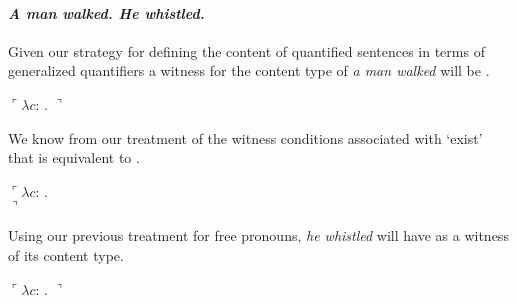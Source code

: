 \paragraph{\textit{A man walked. He whistled.} }
\label{sec:discourse-anaph}
Given our strategy for defining the content of quantified sentences in
terms of generalized quantifiers a witness for the content type of \textit{a man walked}
will be \nexteg{}.
\begin{ex} 
  $\ulcorner\lambda c$: . $\urcorner$ 
\end{ex}
We know from our treatment of the witness conditions associated with
`exist' that \preveg{} is equivalent to \nexteg{}.
\begin{ex} 
  $\ulcorner\lambda c$: . \\
  \hspace*{4em}$\urcorner$
  \label{ex:a-man-walked-derived}
\end{ex} 
Using our previous treatment for free pronouns, \textit{he whistled}
will have \nexteg{} as a witness of its content type.
\begin{ex}
  $\ulcorner\lambda c$:
  . 
  $\urcorner$

  \label{ex:he-whistled-parametric}
\end{ex} 
